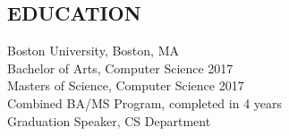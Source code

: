 \documentclass{res}
\begin{document}
\begin{resume}
    
\section{EDUCATION}          
    Boston University, Boston, MA  \\        
    Bachelor of Arts, Computer Science 2017 \\
    Masters of Science, Computer Science 2017  \\       
    Combined BA/MS Program, completed in 4 years \\
    Graduation Speaker, CS Department
    

\end{resume}
\end{document}

